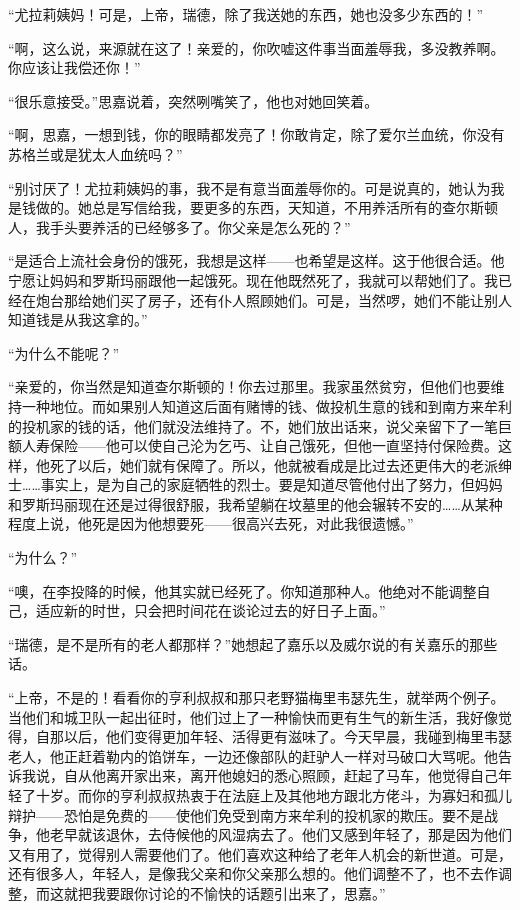 \par “尤拉莉姨妈！可是，上帝，瑞德，除了我送她的东西，她也没多少东西的！”
\par “啊，这么说，来源就在这了！亲爱的，你吹嘘这件事当面羞辱我，多没教养啊。你应该让我偿还你！”
\par “很乐意接受。”思嘉说着，突然咧嘴笑了，他也对她回笑着。
\par “啊，思嘉，一想到钱，你的眼睛都发亮了！你敢肯定，除了爱尔兰血统，你没有苏格兰或是犹太人血统吗？”
\par “别讨厌了！尤拉莉姨妈的事，我不是有意当面羞辱你的。可是说真的，她认为我是钱做的。她总是写信给我，要更多的东西，天知道，不用养活所有的查尔斯顿人，我手头要养活的已经够多了。你父亲是怎么死的？”
\par “是适合上流社会身份的饿死，我想是这样——也希望是这样。这于他很合适。他宁愿让妈妈和罗斯玛丽跟他一起饿死。现在他既然死了，我就可以帮她们了。我已经在炮台那给她们买了房子，还有仆人照顾她们。可是，当然啰，她们不能让别人知道钱是从我这拿的。”
\par “为什么不能呢？”
\par “亲爱的，你当然是知道查尔斯顿的！你去过那里。我家虽然贫穷，但他们也要维持一种地位。而如果别人知道这后面有赌博的钱、做投机生意的钱和到南方来牟利的投机家的钱的话，他们就没法维持了。不，她们放出话来，说父亲留下了一笔巨额人寿保险——他可以使自己沦为乞丐、让自己饿死，但他一直坚持付保险费。这样，他死了以后，她们就有保障了。所以，他就被看成是比过去还更伟大的老派绅士……事实上，是为自己的家庭牺牲的烈士。要是知道尽管他付出了努力，但妈妈和罗斯玛丽现在还是过得很舒服，我希望躺在坟墓里的他会辗转不安的……从某种程度上说，他死是因为他想要死——很高兴去死，对此我很遗憾。”
\par “为什么？”
\par “噢，在李投降的时候，他其实就已经死了。你知道那种人。他绝对不能调整自己，适应新的时世，只会把时间花在谈论过去的好日子上面。”
\par “瑞德，是不是所有的老人都那样？”她想起了嘉乐以及威尔说的有关嘉乐的那些话。
\par “上帝，不是的！看看你的亨利叔叔和那只老野猫梅里韦瑟先生，就举两个例子。当他们和城卫队一起出征时，他们过上了一种愉快而更有生气的新生活，我好像觉得，自那以后，他们变得更加年轻、活得更有滋味了。今天早晨，我碰到梅里韦瑟老人，他正赶着勒内的馅饼车，一边还像部队的赶驴人一样对马破口大骂呢。他告诉我说，自从他离开家出来，离开他媳妇的悉心照顾，赶起了马车，他觉得自己年轻了十岁。而你的亨利叔叔热衷于在法庭上及其他地方跟北方佬斗，为寡妇和孤儿辩护——恐怕是免费的——使他们免受到南方来牟利的投机家的欺压。要不是战争，他老早就该退休，去侍候他的风湿病去了。他们又感到年轻了，那是因为他们又有用了，觉得别人需要他们了。他们喜欢这种给了老年人机会的新世道。可是，还有很多人，年轻人，是像我父亲和你父亲那么想的。他们调整不了，也不去作调整，而这就把我要跟你讨论的不愉快的话题引出来了，思嘉。”
